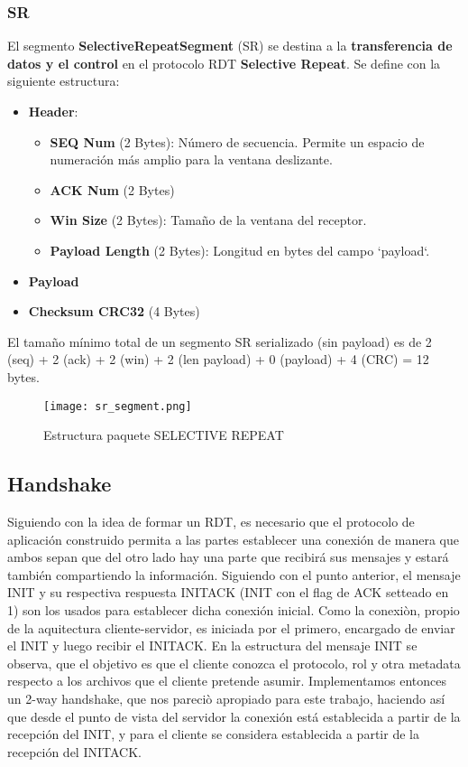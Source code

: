 \documentclass[a4paper,10pt]{article}
\begin{document}
\subsubsection{SR}
El segmento \textbf{SelectiveRepeatSegment} (SR) se destina a la \textbf{transferencia de datos y el control} en el protocolo RDT \textbf{Selective Repeat}. Se define con la siguiente estructura:
\begin{itemize}
    \item \textbf{Header}:
    \begin{itemize}
        \item \textbf{SEQ Num} (2 Bytes): Número de secuencia. Permite un espacio de numeración más amplio para la ventana deslizante.
        \item \textbf{ACK Num} (2 Bytes)
        \item \textbf{Win Size} (2 Bytes): Tamaño de la ventana del receptor.
        \item \textbf{Payload Length} (2 Bytes): Longitud en bytes del campo `payload`.
    \end{itemize}
    \item \textbf{Payload}
    
    \item \textbf{Checksum CRC32} (4 Bytes)
\end{itemize}
El tamaño mínimo total de un segmento SR serializado (sin payload) es de 2 (seq) + 2 (ack) + 2 (win) + 2 (len payload) + 0 (payload) + 4 (CRC) = 12 bytes.
\begin{figure}[H]
    \centering
    \texttt{[image: sr\_segment.png]}
    \caption{Estructura paquete SELECTIVE REPEAT}
\end{figure}


\subsection{Handshake}
Siguiendo con la idea de formar un RDT, es necesario que el protocolo de aplicación construido permita a las partes establecer una conexión de manera que ambos sepan que del otro lado hay una parte que recibirá sus mensajes y estará también compartiendo la información. Siguiendo con el punto anterior, el mensaje INIT y su respectiva respuesta INITACK (INIT con el flag de ACK setteado en 1) son los usados para establecer dicha conexión inicial.
Como la conexiòn, propio de la aquitectura cliente-servidor, es iniciada por el primero, encargado de enviar el INIT y luego recibir el INITACK. 
En la estructura del mensaje INIT se observa, que el objetivo es que el cliente conozca el protocolo, rol y otra metadata respecto a los archivos que el cliente pretende asumir. 
Implementamos entonces un 2-way handshake, que nos pareciò apropiado para este trabajo, haciendo así que desde el punto de vista del servidor la conexión está establecida a partir de la recepción del INIT, y para el cliente se considera establecida a partir de la recepción del INITACK.
\end{document}
